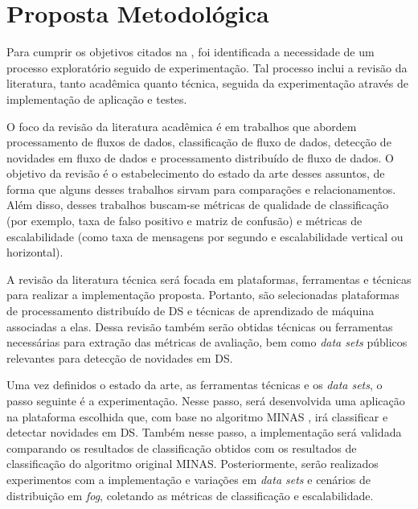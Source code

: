 
\section{Proposta Metodológica}

Para cumprir os objetivos citados na , foi identificada a necessidade
de um processo exploratório seguido de experimentação. Tal processo inclui a
revisão da literatura, tanto acadêmica quanto técnica, seguida da experimentação
através de implementação de aplicação e testes.

O foco da revisão da literatura acadêmica é em trabalhos que abordem
processamento de fluxos de dados, classificação de fluxo de dados, detecção de
novidades em fluxo de dados e processamento distribuído de fluxo de dados.
O objetivo da revisão é o estabelecimento do estado da arte desses assuntos,
de forma que alguns desses trabalhos sirvam para comparações e relacionamentos.
Além disso, desses trabalhos buscam-se métricas de qualidade de classificação
(por exemplo, taxa de falso positivo e matriz de confusão) e métricas de
escalabilidade (como taxa de mensagens por segundo e escalabilidade vertical ou
horizontal).

A revisão da literatura técnica será focada em plataformas, ferramentas e técnicas
para realizar a implementação proposta.
Portanto, são selecionadas plataformas de processamento distribuído de DS
e técnicas de aprendizado de máquina associadas a elas.
Dessa revisão também serão obtidas técnicas ou ferramentas necessárias
para extração das métricas de avaliação, bem como \emph{data sets}
públicos relevantes para detecção de novidades em DS.

Uma vez definidos o estado da arte, as ferramentas técnicas e os
\emph{data sets}, o passo seguinte é a experimentação.
Nesse passo, será desenvolvida uma aplicação na plataforma escolhida que, com base no
algoritmo MINAS \cite{Faria2015minas}, irá classificar e detectar novidades em DS.
Também nesse passo, a implementação será validada comparando os resultados de
classificação obtidos com os resultados de classificação do algoritmo original
MINAS.
Posteriormente, serão realizados experimentos com a implementação e variações em \emph{data sets} e
cenários de distribuição em \emph{fog}, coletando as métricas de classificação e escalabilidade.

